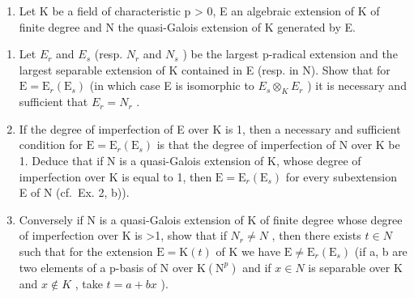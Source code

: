 \begin{enumerate}
\def\labelenumi{\arabic{enumi})}
\setcounter{enumi}{5}
\tightlist
\item
  Let K be a field of characteristic p \textgreater{} 0, E an algebraic extension of K of finite degree and N the quasi-Galois extension of K generated by E.
\end{enumerate}

\begin{enumerate}
\def\labelenumi{\alph{enumi})}
\item
  Let \(E_{r}\) and \(E_{s}\) (resp. \(N_{r}\) and \(N_{s}\) ) be the largest p-radical extension and the largest separable extension of K contained in E (resp. in N). Show that for \(\mathrm{E} = \mathrm{E}_{r}(\mathrm{E}_{s})\) (in which case E is isomorphic to \(E_{s} \otimes_{K} E_{r}\) ) it is necessary and sufficient that \(E_{r} = N_{r}\) .
\item
  If the degree of imperfection of E over K is 1, then a necessary and sufficient condition for \(\mathrm{E} = \mathrm{E}_{r}(\mathrm{E}_{s})\) is that the degree of imperfection of N over K be 1. Deduce that if N is a quasi-Galois extension of K, whose degree of imperfection over K is equal to 1, then \(\mathrm{E} = \mathrm{E}_{r}(\mathrm{E}_{s})\) for every subextension E of N (cf.~Ex. 2, b)).
\item
  Conversely if N is a quasi-Galois extension of K of finite degree whose degree of imperfection over K is \textgreater1, show that if \(N_{r} \neq N\) , then there exists \(t \in N\) such that for the extension \(\mathrm{E} = \mathrm{K}(t)\) of K we have \(\mathrm{E} \neq \mathrm{E}_{r}(\mathrm{E}_{s})\) (if a, b are two elements of a p-basis of N over \(\mathrm{K}(\mathrm{N}^{p})\) and if \(x \in N\) is separable over K and \(x \notin K\) , take \(t = a + bx\) ).
\end{enumerate}

